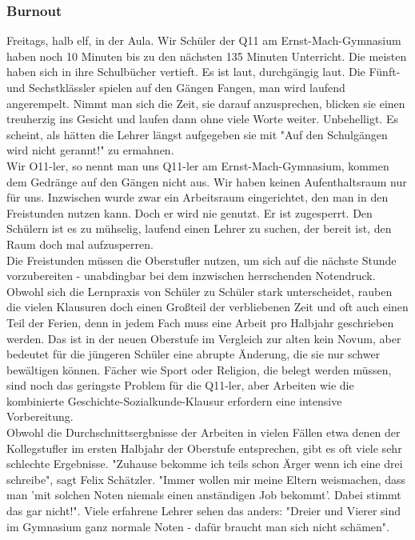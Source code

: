 \documentclass[a4paper,12pt,oneside]{scrbook}
\begin{document}
\subsubsection{Burnout}
Freitags, halb elf, in der Aula. Wir Schüler der Q11 am Ernst-Mach-Gymnasium haben noch 10 Minuten bis zu den nächsten 135 Minuten Unterricht. Die meisten haben sich in ihre Schulbücher vertieft. Es ist laut, durchgängig laut. Die Fünft- und Sechstklässler spielen auf den Gängen Fangen, man wird laufend angerempelt. Nimmt man sich die Zeit, sie darauf anzusprechen, blicken sie einen treuherzig ins Gesicht und laufen dann ohne viele Worte weiter. Unbehelligt. Es scheint, als hätten die Lehrer längst aufgegeben sie mit "Auf den Schulgängen wird nicht gerannt!" zu ermahnen.
\\
Wir O11-ler, so nennt man uns Q11-ler am Ernst-Mach-Gymnasium, kommen dem Gedränge auf den Gängen nicht aus. Wir haben keinen Aufenthaltsraum nur für uns. Inzwischen wurde zwar ein Arbeitsraum eingerichtet, den man in den Freistunden nutzen kann. Doch er wird nie genutzt. Er ist zugesperrt. Den Schülern ist es zu mühselig, laufend einen Lehrer zu suchen, der bereit ist, den Raum doch mal aufzusperren.
\\
Die Freistunden müssen die Oberstufler nutzen, um sich auf die nächste Stunde vorzubereiten - unabdingbar bei dem inzwischen herrschenden Notendruck. Obwohl sich die Lernpraxis von Schüler zu Schüler stark unterscheidet, rauben die vielen Klausuren doch einen Großteil der verbliebenen Zeit und oft auch einen Teil der Ferien, denn in jedem Fach muss eine Arbeit pro Halbjahr geschrieben werden. Das ist in der neuen Oberstufe im Vergleich zur alten kein Novum, aber bedeutet für die jüngeren Schüler eine abrupte Änderung, die sie nur schwer bewältigen können. Fächer wie Sport oder Religion, die belegt werden müssen, sind noch das geringste Problem für die Q11-ler, aber Arbeiten wie die kombinierte Geschichte-Sozialkunde-Klausur erfordern eine intensive Vorbereitung.
\\
Obwohl die Durchschnittsergbnisse der Arbeiten in vielen Fällen etwa denen der Kollegstufler im ersten Halbjahr der Oberstufe entsprechen, gibt es oft viele sehr schlechte Ergebnisse. "Zuhause bekomme ich teils schon Ärger wenn ich eine drei schreibe", sagt Felix Schätzler. "Immer wollen mir meine Eltern weismachen, dass man 'mit solchen Noten niemals einen anständigen Job bekommt'. Dabei stimmt das gar nicht!".
Viele erfahrene Lehrer sehen das anders: "Dreier und Vierer sind im Gymnasium ganz normale Noten - dafür braucht man sich nicht schämen".
\end{document}
